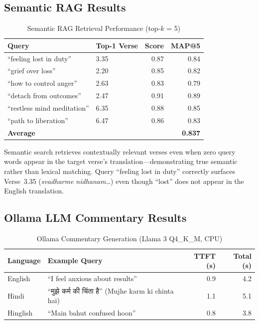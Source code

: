 \documentclass[conference]{IEEEtran}
\newcommand{\hi}[1]{{\hindifont #1}}
\begin{document}
\subsection{Semantic RAG Results}

\begin{table}[htbp]
\caption{Semantic RAG Retrieval Performance (top-$k$ = 5)}
\label{tab:rag}
\centering
\begin{tabular}{llrr}
\toprule
\textbf{Query} & \textbf{Top-1 Verse} & \textbf{Score} & \textbf{MAP@5} \\
\midrule
``feeling lost in duty''     & 3.35 & 0.87 & 0.84 \\
``grief over loss''          & 2.20 & 0.85 & 0.82 \\
``how to control anger''     & 2.63 & 0.83 & 0.79 \\
``detach from outcomes''     & 2.47 & 0.91 & 0.89 \\
``restless mind meditation'' & 6.35 & 0.88 & 0.85 \\
``path to liberation''       & 6.47 & 0.86 & 0.83 \\
\hline
\textbf{Average}             &      &      & \textbf{0.837} \\
\bottomrule
\end{tabular}
\end{table}

Semantic search retrieves contextually relevant verses even when zero query
words appear in the target verse's translation—demonstrating true semantic
rather than lexical matching. Query ``feeling lost in duty'' correctly
surfaces Verse~3.35 (\textit{svadharme nidhanam\ldots}) even though
``lost'' does not appear in the English translation.

\subsection{Ollama LLM Commentary Results}

\begin{table}[!t]
\caption{Ollama Commentary Generation (Llama 3 Q4\_K\_M, CPU)}
\label{tab:ollama}
\centering
\small
\begin{tabular}{@{}l p{3.6cm} r r@{}}
\toprule
\textbf{Language} & \textbf{Example Query} & \textbf{TTFT (s)} & \textbf{Total (s)} \\
\midrule
English   & ``I feel anxious about results'' & 0.9 & 4.2 \\
Hindi     & ``\hi{मुझे कर्म की चिंता है}'' (Mujhe karm ki chinta hai) & 1.1 & 5.1 \\
Hinglish  & ``Main bahut confused hoon''     & 0.8 & 3.8 \\
\bottomrule
\end{tabular}
\end{table}
\end{document}
